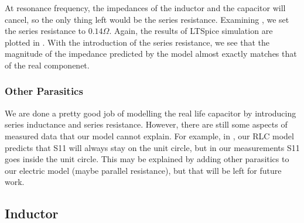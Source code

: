 \documentclass{article}
\begin{document}
At resonance frequency, the impedances of the inductor and the capacitor will cancel, so the only thing left would be the series resistance.
Examining , we set the series resistance to $0.14\Omega$.
Again, the results of LTSpice simulation are plotted in .
With the introduction of the series resistance, we see that the magnitude of the impedance predicted by the model almost exactly matches that of the real componenet.

\subsubsection{Other Parasitics}
We are done a pretty good job of modelling the real life capacitor by introducing series inductance and series resistance.
However, there are still some aspects of measured data that our model cannot explain.
For example, in , our RLC model predicts that S11 will always stay on the unit circle, but in our measurements S11 goes inside the unit circle.
This may be explained by adding other parasitics to our electric model (maybe parallel resistance), but that will be left for future work.

\subsection{Inductor}
\end{document}

